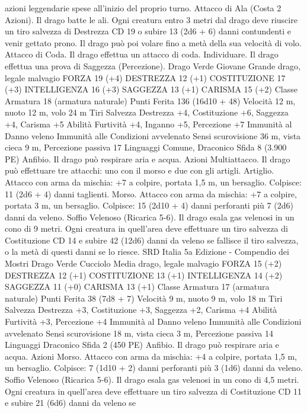 \begin{multicols}{2}
azioni leggendarie spese all’inizio del proprio turno.
Attacco di Ala (Costa 2 Azioni). Il drago batte le ali. Ogni
creatura entro 3 metri dal drago deve riuscire un tiro salvezza di
Destrezza CD 19 o subire 13 (2d6 + 6) danni contundenti e venir
gettato prono. Il drago può poi volare fino a metà della sua
velocità di volo.
Attacco di Coda. Il drago effettua un attacco di coda.
Individuare. Il drago effettua una prova di Saggezza
(Percezione).
Drago Verde Giovane
Grande drago, legale malvagio
FORZA 19 (+4)
DESTREZZA 12 (+1)
COSTITUZIONE 17 (+3)
INTELLIGENZA 16 (+3)
SAGGEZZA 13 (+1)
CARISMA 15 (+2)
Classe Armatura 18 (armatura naturale)
Punti Ferita 136 (16d10 + 48)
Velocità 12 m, nuoto 12 m, volo 24 m
Tiri Salvezza Destrezza +4, Costituzione +6, Saggezza +4, Carisma +5
Abilità Furtività +4, Inganno +5, Percezione +7
Immunità al Danno veleno
Immunità alle Condizioni avvelenato
Sensi scurovisione 36 m, vista cieca 9 m, Percezione passiva 17
Linguaggi Comune, Draconico
Sfida 8 (3.900 PE)
Anfibio. Il drago può respirare aria e acqua.
Azioni
Multiattacco. Il drago può effettuare tre attacchi: uno con il
morso e due con gli artigli.
Artiglio. Attacco con arma da mischia: +7 a colpire, portata 1,5
m, un bersaglio.
Colpisce: 11 (2d6 + 4) danni taglienti.
Morso. Attacco con arma da mischia: +7 a colpire, portata 3 m,
un bersaglio.
Colpisce: 15 (2d10 + 4) danni perforanti più 7 (2d6) danni da veleno.
Soffio Velenoso (Ricarica 5-6). Il drago esala gas velenosi in un
cono di 9 metri. Ogni creatura in quell’area deve effettuare un tiro
salvezza di Costituzione CD 14 e subire 42 (12d6) danni da veleno se
fallisce il tiro salvezza, o la metà di questi danni se lo riesce.
SRD Italia 5a Edizione - Compendio dei Mostri
Drago Verde Cucciolo
Media drago, legale malvagio
FORZA 15 (+2)
DESTREZZA 12 (+1)
COSTITUZIONE 13 (+1)
INTELLIGENZA 14 (+2)
SAGGEZZA 11 (+0)
CARISMA 13 (+1)
Classe Armatura 17 (armatura naturale)
Punti Ferita 38 (7d8 + 7)
Velocità 9 m, nuoto 9 m, volo 18 m
Tiri Salvezza Destrezza +3, Costituzione +3, Saggezza +2,
Carisma +4
Abilità Furtività +3, Percezione +4
Immunità al Danno veleno
Immunità alle Condizioni avvelenato
Sensi scurovisione 18 m, vista cieca 3 m, Percezione passiva 14
Linguaggi Draconico
Sfida 2 (450 PE)
Anfibio. Il drago può respirare aria e acqua.
Azioni
Morso. Attacco con arma da mischia: +4 a colpire, portata 1,5
m, un bersaglio.
Colpisce: 7 (1d10 + 2) danni perforanti più 3 (1d6) danni da veleno.
Soffio Velenoso (Ricarica 5-6). Il drago esala gas velenosi in un
cono di 4,5 metri. Ogni creatura in quell’area deve effettuare un tiro
salvezza di Costituzione CD 11 e subire 21 (6d6) danni da veleno se

\end{multicols}
